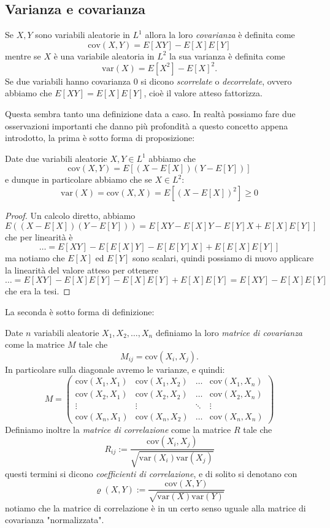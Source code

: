 \documentclass[11pt]{scrartcl}
\begin{document}
	\subsection{Varianza e covarianza}
	\begin{definition}
		Se $X,Y$ sono variabili aleatorie in $L^1$ allora la loro \textit{covarianza} è definita come
		$$\text{cov}\left(X,Y\right)=E[XY]-E[X]E[Y]$$
		mentre se $X$ è una variabile aleatoria in $L^2$ la sua varianza è definita come
		$$\text{var}(X)=E[X^2]-E[X]^2.$$
		Se due variabili hanno covarianza $0$ si dicono \textit{scorrelate} o \textit{decorrelate}, ovvero abbiamo che $E[XY]=E[X]E[Y]$, cioè il valore atteso fattorizza.
	\end{definition}
	Questa sembra tanto una definizione data a caso. In realtà possiamo fare due osservazioni importanti che danno più profondità a questo concetto appena introdotto, la prima è sotto forma di proposizione:
	\begin{proposition}
		Date due variabili aleatorie $X,Y\in L^1$ abbiamo che 
		$$\text{cov}(X,Y)=E\left[(X-E[X])(Y-E[Y])\right]$$
		e dunque in particolare abbiamo che se $X\in L^2$:
		$$\text{var}(X)=\text{cov}(X,X)=E\left[(X-E[X])^2\right]\ge 0$$
	\end{proposition}
	\begin{proof}
		Un calcolo diretto, abbiamo
		$$E\left((X-E[X])(Y-E[Y])\right)=E\left[XY-E[X]Y-E[Y]X+E[X]E[Y]\right]$$
		che per linearità è
		$$\dots=E[XY]-E[E[X]Y]-E[E[Y]X]+E[E[X]E[Y]]$$
		ma notiamo che $E[X]$ ed $E[Y]$ sono scalari, quindi possiamo di nuovo applicare la linearità del valore atteso per ottenere
		$$\dots=E[XY]-E[X]E[Y]-E[X]E[Y]+E[X]E[Y]=E[XY]-E[X]E[Y]$$
		che era la tesi.
	\end{proof}
	La seconda è sotto forma di definizione:
	\begin{definition}
		Date $n$ variabili aleatorie $X_1,X_2,\dots,X_n$ definiamo la loro \textit{matrice di covarianza} come la matrice $M$ tale che
		$$M_{ij}=\text{cov}(X_i,X_j).$$
		In particolare sulla diagonale avremo le varianze, e  quindi:
		$$M=
		\begin{pmatrix}
			\text{cov}(X_1,X_1) & \text{cov}(X_1,X_2) & \dots & \text{cov}(X_1,X_n) \\
			\text{cov}(X_2,X_1) & \text{cov}(X_2,X_2) & \dots & \text{cov}(X_2,X_n) \\
			\vdots & \vdots & \ddots & \vdots \\
			\text{cov}(X_n,X_1) & \text{cov}(X_n,X_2) & \dots & \text{cov}(X_n,X_n)
		\end{pmatrix}
		$$ 
		Definiamo inoltre la \textit{matrice di correlazione} come la matrice $R$ tale che
		$$R_{ij}:=\frac{\text{cov}(X_i,X_j)}{\sqrt{\text{var}(X_i)\text{var}(X_j)}}$$ 
		questi termini si dicono \textit{coefficienti di correlazione}, e di solito si denotano con
		$$\varrho(X,Y):=\frac{\text{cov}(X,Y)}{\sqrt{\text{var}(X)\text{var}(Y)}}$$
		notiamo che la matrice di correlazione è in un certo senso uguale alla matrice di covarianza "normalizzata".
	\end{definition}
\end{document}
